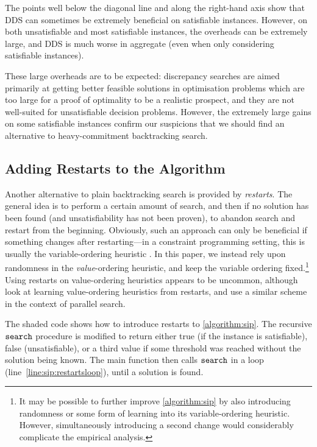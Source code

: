 \documentclass{article}
\newcommand{\citet}[1]{\citeauthor{#1} \shortcite{#1}}
\newcommand{\citep}[1]{\cite{#1}}
\newcommand{\siplineref}[1]{line~\ref{line:sip:#1}}
\begin{document}
The points well below the diagonal line and along the right-hand axis show that DDS can sometimes be
extremely beneficial on satisfiable instances.  However, on both unsatisfiable and most satisfiable
instances, the overheads can be extremely large, and DDS is much worse in aggregate (even when only
considering satisfiable instances).

These large overheads are to be expected: discrepancy searches are aimed primarily at getting better
feasible solutions in optimisation problems which are too large for a proof of optimality to be a
realistic prospect, and they are not well-suited for unsatisfiable decision problems. However, the
extremely large gains on some satisfiable instances confirm our suspicions that we should find an
alternative to heavy-commitment backtracking search.

\subsection{Adding Restarts to the Algorithm}

Another alternative to plain backtracking search is provided by \emph{restarts}. The general idea is
to perform a certain amount of search, and then if no solution has been found (and unsatisfiability
has not been proven), to abandon search and restart from the beginning. Obviously, such an approach
can only be beneficial if something changes after restarting---in a constraint programming setting,
this is usually the variable-ordering heuristic
\citep{DBLP:journals/jsat/LecoutreSTV07,DBLP:conf/cp/GayHLS15,DBLP:conf/aaai/LeeSZ16,DBLP:conf/cp/GlorianBLLM17}.
In this paper, we instead rely upon randomness in the \emph{value}-ordering heuristic, and keep the
variable ordering fixed.\footnote{It may be possible to further improve \cref{algorithm:sip} by also
introducing randomness or some form of learning into its variable-ordering heuristic. However,
simultaneously introducing a second change would considerably complicate the empirical analysis.}
Using restarts on value-ordering heuristics appears to be uncommon, although
\citet{DBLP:conf/flairs/RazgonOP07} look at learning value-ordering heuristics from restarts, and
\citet{DBLP:conf/cp/ChuSS09} use a similar scheme in the context of parallel search.

The shaded code shows how to introduce restarts to \cref{algorithm:sip}. The recursive
$\FuncSty{search}$ procedure is modified to return either true (if the instance is satisfiable),
false (unsatisfiable), or a third value if some threshold was reached without the solution being
known.  The main function then calls $\FuncSty{search}$ in a loop (\siplineref{restartsloop}), until
a solution is found.
\end{document}

